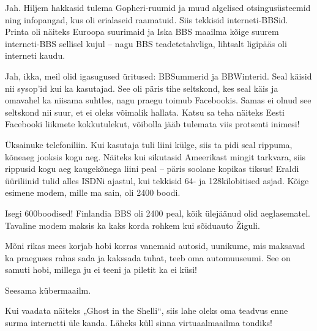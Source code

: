 Jah. Hiljem hakkasid tulema Gopheri-ruumid ja muud algelised 
otsingusüsteemid ning infopangad, kus oli erialaseid raamatuid. Siis tekkisid 
interneti-BBSid. Printa oli näiteks Euroopa suurimaid ja 
Iska BBS 
maailma kõige suurem interneti-BBS sellisel kujul -- nagu BBS 
teadetetahvliga, lihtsalt ligipääs oli interneti kaudu.


Jah, ikka, meil olid igasugused üritused: BBSummerid ja 
BBWinterid. Seal käisid nii sysop'id kui ka kasutajad. See oli 
päris tihe seltskond, kes seal käis ja omavahel ka niisama suhtles, 
nagu praegu toimub Facebookis. Samas ei olnud see seltskond nii suur, et 
ei oleks võimalik hallata. Katsu sa teha näiteks Eesti Facebooki liikmete 
kokkutulekut, võibolla jääb tulemata viis protsenti inimesi!


Üksainuke telefoniliin. Kui kasutaja tuli liini külge, 
siis ta pidi seal rippuma, kõneaeg jooksis kogu aeg. Näiteks kui 
sikutasid Ameerikast mingit tarkvara, siis rippusid kogu aeg 
kaugekõnega liini peal -- päris soolane kopikas tiksus! Eraldi üüriliinid tulid 
alles ISDNi ajastul, kui tekkisid 64- ja 128kilobitised asjad. Kõige 
esimene modem, mille ma sain, oli 2400 boodi.


Isegi 600boodised! Finlandia BBS oli 2400 peal, kõik ülejäänud 
olid aeglasematel. Tavaline modem maksis ka kaks korda rohkem kui sõiduauto 
Žiguli.


Mõni rikas mees korjab hobi korras vanemaid autosid, 
uunikume, mis maksavad ka praeguses rahas sada ja kakssada tuhat, 
teeb oma automuuseumi. See on samuti hobi, millega ju ei 
teeni ja piletit ka ei küsi!


Seesama kübermaailm. 

Kui vaadata näiteks „Ghost in the Shelli“, siis lahe oleks 
oma teadvus enne surma internetti üle kanda. Läheks küll sinna 
virtuaalmaailma tondiks!

